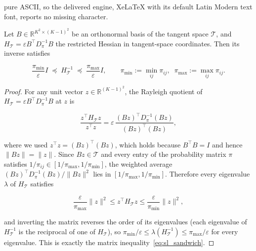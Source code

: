 \documentclass[10pt,a4paper]{amsart}
\begin{document}
pure ASCII, so the delivered engine, XeLaTeX with its default Latin Modern text font, reports no missing character.
\begin{lemma}\label{lem:sandwich}
Let $B\in\mathbb{R}^{K^2\times(K-1)^2}$ be an orthonormal basis of the tangent space
$\mathcal{T}$, and $H_{\mathcal{T}}=\varepsilon B^{\top}D_\pi^{-1}B$ the restricted Hessian
in tangent-space coordinates. Then its inverse satisfies

\begin{equation}
\boxed{\frac{\pi_{\min}}{\varepsilon}I\;\preceq\;H_{\mathcal{T}}^{-1}\;\preceq\;\frac{\pi_{\max}}{\varepsilon}I},\qquad
\pi_{\min}:=\min_{ij}\pi_{ij},\;\;
\pi_{\max}:=\max_{ij}\pi_{ij}. \label{eq:sl_sandwich}
\end{equation}
\end{lemma}

\begin{proof}
For any unit vector $z\in\mathbb{R}^{(K-1)^2}$, the Rayleigh quotient of
$H_{\mathcal{T}}=\varepsilon B^{\top}D_\pi^{-1}B$ at $z$ is

\[
\frac{z^{\top}H_{\mathcal{T}}z}{z^{\top}z}=\varepsilon\,\frac{(Bz)^{\top}D_\pi^{-1}(Bz)}{(Bz)^{\top}(Bz)},
\]

where we used $z^{\top}z=(Bz)^{\top}(Bz)$, which holds because $B^{\top}B=I$ and hence
$\|Bz\|=\|z\|$. Since $Bz\in\mathcal{T}$ and every entry of the probability matrix $\pi$
satisfies $1/\pi_{ij}\in[1/\pi_{\max},1/\pi_{\min}]$, the weighted average
$(Bz)^{\top}D_\pi^{-1}(Bz)/\|Bz\|^2$ lies in $[1/\pi_{\max},1/\pi_{\min}]$. Therefore every
eigenvalue $\lambda$ of $H_{\mathcal{T}}$ satisfies

\[
\frac{\varepsilon}{\pi_{\max}}\|z\|^2\le z^{\top}H_{\mathcal{T}}z\le\frac{\varepsilon}{\pi_{\min}}\|z\|^2,
\]

and inverting the matrix reverses the order of its eigenvalues (each eigenvalue of
$H_{\mathcal{T}}^{-1}$ is the reciprocal of one of $H_{\mathcal{T}}$), so
$\pi_{\min}/\varepsilon\le\lambda(H_{\mathcal{T}}^{-1})\le\pi_{\max}/\varepsilon$ for every
eigenvalue. This is exactly the matrix inequality~\eqref{eq:sl_sandwich}.
\end{proof}
\end{document}
